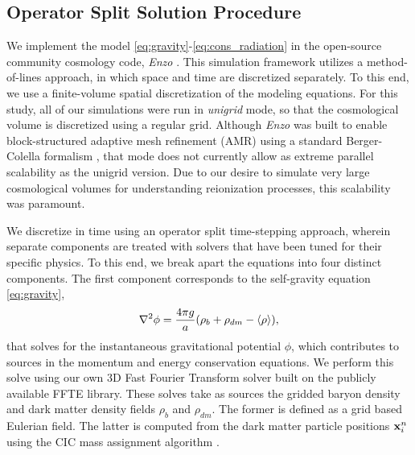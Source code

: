 \subsection{Operator Split Solution Procedure}

We implement the model \eqref{eq:gravity}-\eqref{eq:cons_radiation} in
the open-source community cosmology code, {\em Enzo} \citep{Bryan2014}.  This
simulation framework utilizes a method-of-lines approach, in which
space and time are discretized separately.  To this end, we use a
finite-volume spatial discretization of the modeling equations.  For
this study, all of our simulations were run in {\em unigrid} mode, so
that the cosmological volume is discretized using a regular grid.
Although {\em Enzo} was built to enable block-structured adaptive mesh
refinement (AMR) using a standard Berger-Colella formalism
\citep{BergerColella89}, that mode does not currently allow as
extreme parallel scalability as the unigrid version.  Due to our
desire to simulate very large cosmological volumes for understanding
reionization processes, this scalability was paramount.

We discretize in time using an operator split time-stepping approach,
wherein separate components are treated with solvers that have been
tuned for their specific physics. To this end, we break apart the
equations into four distinct components.  The first component
corresponds to the self-gravity equation \eqref{eq:gravity}, 
\begin{equation}
\label{eq:self_gravity}
  \nabla^2 \phi = \frac{4\pi g}{a}(\rhob + \rho_{dm} - \langle \rho
  \rangle), 
\end{equation}
that solves for the instantaneous gravitational potential $\phi$,
which contributes to sources in the momentum and energy conservation
equations.  We perform this solve using our own 3D Fast Fourier Transform
solver built on the publicly available FFTE library.
These solves take as sources
the gridded baryon density and dark matter density fields $\rho_b$
and $\rho_{dm}$. The former is defined as a grid based Eulerian field. 
The latter is computed from the dark matter particle positions ${\bf x}_i^n$
using the CIC mass assignment algorithm \citep{HockneyEastwood1988}. 

